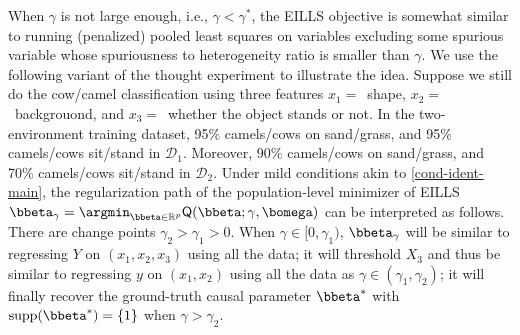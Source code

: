 \documentclass[10pt]{article}
\numberwithin{equation}{section}
\begin{document}
When $\gamma$ is not large enough, i.e., $\gamma < \gamma^*$, the EILLS objective is somewhat similar to running (penalized) pooled least squares on variables excluding some spurious variable whose spuriousness to heterogeneity ratio is smaller than $\gamma$. We use the following variant of the thought experiment to illustrate the idea. Suppose we still do the cow/camel classification using three features $x_1=$~shape, $x_2=$~backgrouond, and $x_3=$~whether the object stands or not. In the two-environment training dataset, 95\% camels/cows on sand/grass, and 95\% camels/cows sit/stand in $\mathcal{D}_1$. Moreover, 90\% camels/cows on sand/grass, and 70\% camels/cows sit/stand in $\mathcal{D}_2$. Under mild conditions akin to \cref{cond-ident-main}, the regularization path of the population-level minimizer of EILLS $\bbeta_\gamma = \argmin_{\bbeta\in \mathbb{R}^p} \mathsf{Q}(\bbeta;\gamma,\bomega)$ can be interpreted as follows. There are change points $\gamma_2>\gamma_1>0$. When $\gamma \in [0,\gamma_1)$, $\bbeta_\gamma$ will be similar to regressing $Y$ on $(x_1,x_2, x_3)$ using all the data; it will threshold $X_3$ and thus be similar to regressing $y$ on $(x_1,x_2)$ using all the data as $\gamma \in (\gamma_1, \gamma_2)$; it will finally recover the ground-truth causal parameter $\bbeta^*$ with $\mathrm{supp}(\bbeta^*)=\{1\}$ when $\gamma > \gamma_2$.

\end{document}
